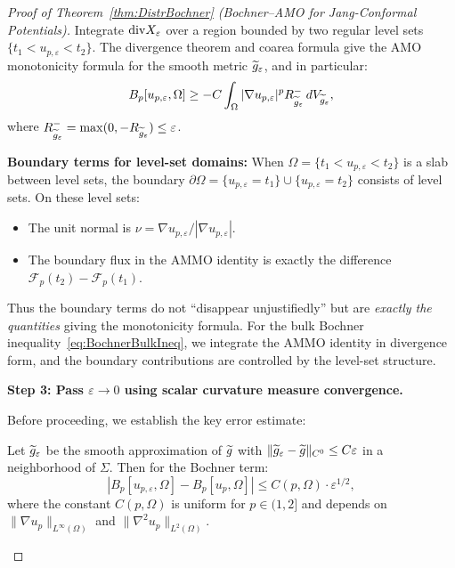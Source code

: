 \begin{proof}[Proof of Theorem~\ref{thm:DistrBochner} (Bochner--AMO for Jang-Conformal Potentials)]
Integrate $\mathrm{div} X_\varepsilon$ over a region bounded by two regular level sets $\{t_1 < u_{p,\varepsilon} < t_2\}$. The divergence theorem and coarea formula give the AMO monotonicity formula for the smooth metric $\widetilde{g}_\varepsilon$, and in particular:
\begin{equation}\label{eq:BochnerBulkEps}
    B_p[u_{p,\varepsilon}, \Omega] \ge -C \int_\Omega |\nabla u_{p,\varepsilon}|^p R_{\widetilde{g}_\varepsilon}^- \, dV_{\widetilde{g}_\varepsilon},
\end{equation}
where $R_{\widetilde{g}_\varepsilon}^- = \max(0, -R_{\widetilde{g}_\varepsilon}) \le \varepsilon$.

\textbf{Boundary terms for level-set domains:} When $\Omega = \{t_1 < u_{p,\varepsilon} < t_2\}$ is a slab between level sets, the boundary $\partial\Omega = \{u_{p,\varepsilon} = t_1\} \cup \{u_{p,\varepsilon} = t_2\}$ consists of level sets. On these level sets:
\begin{itemize}
    \item The unit normal is $\nu = \nabla u_{p,\varepsilon}/|\nabla u_{p,\varepsilon}|$.
    \item The boundary flux in the AMMO identity is exactly the difference $\mathcal{F}_p(t_2) - \mathcal{F}_p(t_1)$.
\end{itemize}
Thus the boundary terms do not ``disappear unjustifiedly'' but are \emph{exactly the quantities} giving the monotonicity formula. For the bulk Bochner inequality~\eqref{eq:BochnerBulkIneq}, we integrate the AMMO identity in divergence form, and the boundary contributions are controlled by the level-set structure.

\textbf{Step 3: Pass $\varepsilon \to 0$ using scalar curvature measure convergence.}

Before proceeding, we establish the key error estimate:

\begin{lemma}\label{lem:MollificationError}
Let $\widetilde{g}_\varepsilon$ be the smooth approximation of $\widetilde{g}$ with $\|\widetilde{g}_\varepsilon - \widetilde{g}\|_{C^0} \le C\varepsilon$ in a neighborhood of $\Sigma$. Then for the Bochner term:
\begin{equation}
    \left| B_p[u_{p,\varepsilon}, \Omega] - B_p[u_p, \Omega] \right| \le C(p, \Omega) \cdot \varepsilon^{1/2},
\end{equation}
where the constant $C(p,\Omega)$ is uniform for $p \in (1, 2]$ and depends on $\|\nabla u_p\|_{L^\infty(\Omega)}$ and $\|\nabla^2 u_p\|_{L^2(\Omega)}$.
\end{lemma}


\end{proof}
